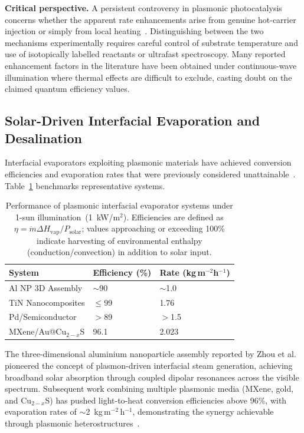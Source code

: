 \documentclass[twocolumn,10pt]{article}
\begin{document}
\noindent\textbf{Critical perspective.}  A persistent controversy in
plasmonic photocatalysis concerns whether the apparent rate enhancements
arise from genuine hot-carrier injection or simply from local
heating~\cite{linic2011plasmonic}.  Distinguishing between the two
mechanisms experimentally requires careful control of substrate
temperature and use of isotopically labelled reactants or ultrafast
spectroscopy.  Many reported enhancement factors in the literature have
been obtained under continuous-wave illumination where thermal effects
are difficult to exclude, casting doubt on the claimed quantum efficiency
values.

\subsection{Solar-Driven Interfacial Evaporation and Desalination}

Interfacial evaporators exploiting plasmonic materials have achieved
conversion efficiencies and evaporation rates that were previously
considered unattainable~\cite{zhou2016solar}.  Table~\ref{tab:evaporator}
benchmarks representative systems.

\begin{table}[H]
\small
\centering
\caption{Performance of plasmonic interfacial evaporator systems under
1-sun illumination~(1~kW/m$^2$).  Efficiencies are defined as
$\eta = \dot{m}\Delta H_\mathrm{vap}/P_\mathrm{solar}$; values
approaching or exceeding 100\% indicate harvesting of environmental
enthalpy (conduction/convection) in addition to solar input.}
\label{tab:evaporator}
\begin{tabularx}{\columnwidth}{@{}lXX@{}}
\toprule
\textbf{System} & \textbf{Efficiency (\%)} &
  \textbf{Rate (kg\,m$^{-2}$h$^{-1}$)} \\
\midrule
Al NP 3D Assembly  & $\sim$90 & $\sim$1.0 \\
TiN Nanocomposites   & $\leq$99 & 1.76 \\
Pd/Semiconductor     & $>$89 & $>$1.5 \\
MXene/Au@Cu$_{2-x}$S & 96.1 & 2.023 \\
\bottomrule
\end{tabularx}
\end{table}

The three-dimensional aluminium nanoparticle assembly reported by Zhou
et al.~\cite{zhou2016solar} pioneered the concept of plasmon-driven
interfacial steam generation, achieving broadband solar absorption
through coupled dipolar resonances across the visible spectrum.
Subsequent work combining multiple plasmonic media (MXene, gold, and
Cu$_{2-x}$S) has pushed light-to-heat conversion efficiencies above
96\%, with evaporation rates of $\sim$2~kg\,m$^{-2}$\,h$^{-1}$,
demonstrating the synergy achievable through plasmonic
heterostructures~\cite{anasori2017mxenes}.
\end{document}
